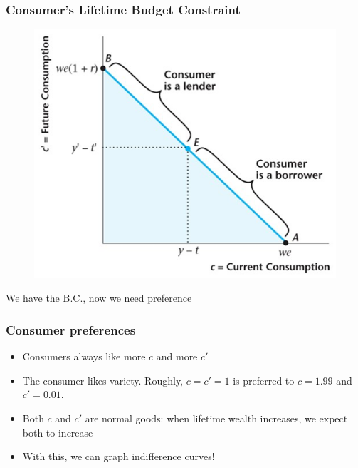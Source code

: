 \documentclass{beamer}
\begin{document}
\begin{frame}
\frametitle[alignment=center]{Consumer's Lifetime Budget Constraint}
\begin{figure}
\centering
\includegraphics[scale=0.5]{Figures/W_Fig_9pt1.png}
\end{figure}
We have the B.C., now we need preference
\end{frame}

\begin{frame}
\frametitle[alignment=center]{Consumer preferences}
\begin{itemize}
\item Consumers always like more $c$ and more $c'$
\bigskip
\item The consumer likes variety.  Roughly, $c=c'=1$ is preferred to $c=1.99$ and $c'=0.01$.  
\bigskip
\item Both $c$ and $c'$ are normal goods: when lifetime wealth increases, we expect both to increase
\bigskip
\item With this, we can graph indifference curves!
\end{itemize}
\end{frame}
\end{document}
